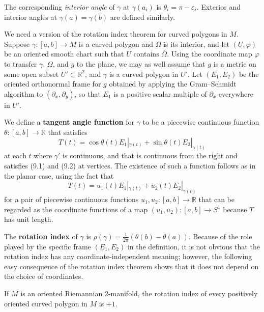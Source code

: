 The corresponding \textit{interior angle} of $\gamma$ at $\gamma(a_i)$ is $\theta_i = \pi - \varepsilon_i$. Exterior and interior angles at $\gamma(a) = \gamma(b)$ are defined similarly.

We need a version of the rotation index theorem for curved polygons in $M$. Suppose $\gamma : [a,b] \to M$ is a curved polygon and $\Omega$ is its interior, and let $(U,\varphi)$ be an oriented smooth chart such that $U$ contains $\overline{\Omega}$. Using the coordinate map $\varphi$ to transfer $\gamma$, $\Omega$, and $g$ to the plane, we may as well assume that $g$ is a metric on some open subset $U' \subset \mathbb{R}^2$, and $\gamma$ is a curved polygon in $U'$. Let $(E_1, E_2)$ be the oriented orthonormal frame for $g$ obtained by applying the Gram--Schmidt algorithm to $(\partial_x, \partial_y)$, so that $E_1$ is a positive scalar multiple of $\partial_x$ everywhere in $U'$.

We define a \textbf{tangent angle function} for $\gamma$ to be a piecewise continuous function $\theta : [a,b] \to \mathbb{R}$ that satisfies
\[
T(t) = \cos\theta(t) E_1|_{\gamma(t)} + \sin\theta(t) E_2|_{\gamma(t)}
\]
at each $t$ where $\gamma'$ is continuous, and that is continuous from the right and satisfies (9.1) and (9.2) at vertices. The existence of such a function follows as in the planar case, using the fact that
\begin{equation}
T(t) = u_1(t) E_1|_{\gamma(t)} + u_2(t) E_2|_{\gamma(t)} \tag{9.5}
\end{equation}
for a pair of piecewise continuous functions $u_1, u_2 : [a,b] \to \mathbb{R}$ that can be regarded as the coordinate functions of a map $(u_1, u_2) : [a,b] \to S^1$ because $T$ has unit length.

The \textbf{rotation index} of $\gamma$ is $\rho(\gamma) = \frac{1}{2\pi}(\theta(b) - \theta(a))$. Because of the role played by the specific frame $(E_1, E_2)$ in the definition, it is not obvious that the rotation index has any coordinate-independent meaning; however, the following easy consequence of the rotation index theorem shows that it does not depend on the choice of coordinates.

\begin{lemma}
\label{lem:rotation-index-plus-one}
If $M$ is an oriented Riemannian $2$-manifold, the rotation index of every positively oriented curved polygon in $M$ is $+1$.
\end{lemma}

